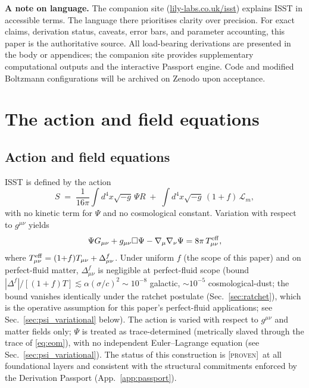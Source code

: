 \documentclass[aps,prd,twocolumn,nofootinbib,floatfix,superscriptaddress]{revtex4-2}
\newcommand{\PROVEN}{{\color{black!75!green}\textsc{[proven]}}}
\newcommand{\Lm}{\mathcal{L}_m}
\newcommand{\Teff}{T^{\rm eff}}
\begin{document}
\textbf{A note on language.} The companion site
(\href{https://lily-labs.co.uk/isst}{lily-labs.co.uk/isst})
explains ISST in accessible terms. The language there prioritises
clarity over precision. For exact claims, derivation status,
caveats, error bars, and parameter accounting, this paper is the
authoritative source. All load-bearing derivations are presented
in the body or appendices; the companion site provides
supplementary computational outputs and the interactive Passport
engine. Code and modified Boltzmann configurations will be
archived on Zenodo upon acceptance.

\section{The action and field equations}
\label{sec:action}

\subsection{Action and field equations}

ISST is defined by the action
\begin{equation}
\label{eq:action}
S \;=\; \frac{1}{16\pi}\!\int\! d^4x\sqrt{-g}\,\Psi R
\;+\; \int\! d^4x\sqrt{-g}\,(1{+}f)\,\Lm,
\end{equation}
with no kinetic term for $\Psi$ and no cosmological constant.
Variation with respect to $g^{\mu\nu}$ yields
\begin{equation}
\label{eq:eom}
\Psi G_{\mu\nu} + g_{\mu\nu}\Box\Psi - \nabla_\mu\nabla_\nu\Psi
= 8\pi\,\Teff_{\mu\nu},
\end{equation}
where $\Teff_{\mu\nu} = (1{+}f)T_{\mu\nu} + \Delta^f_{\mu\nu}$.
Under uniform $f$ (the scope of this paper) and on perfect-fluid
matter, $\Delta^f_{\mu\nu}$ is negligible at perfect-fluid scope
(bound $|\Delta^f|/[(1{+}f)T] \lesssim \alpha(\sigma/c)^2 \sim 10^{-8}$
galactic, $\sim 10^{-5}$ cosmological-dust; the bound vanishes
identically under the ratchet postulate (Sec.~\ref{sec:ratchet}),
which is the operative assumption for this paper's perfect-fluid
applications; see Sec.~\ref{sec:psi_variational} below). The action
is varied with respect to $g^{\mu\nu}$ and matter fields only;
$\Psi$ is treated as trace-determined (metrically slaved through
the trace of \eqref{eq:eom}), with no independent Euler--Lagrange
equation (see Sec.~\ref{sec:psi_variational}). The status of this
construction is \PROVEN\ at all foundational layers and consistent
with the structural commitments enforced by the
Derivation Passport (App.~\ref{app:passport}).
\end{document}
